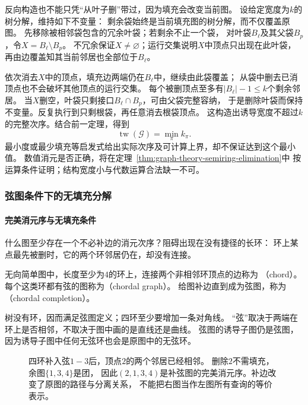 反向构造也不能只凭“从叶子删”带过，因为填充会改变当前图。
设给定宽度为\(k\)的树分解，维持如下不变量：
剩余袋始终是当前填充图的树分解，而不仅覆盖原图。
先移除被相邻袋包含的冗余叶袋；若剩余不止一个袋，
对叶袋\(B_\ell\)及其父袋\(B_p\)，令\(X=B_\ell\setminus B_p\)。
不冗余保证\(X\neq\varnothing\)；运行交集说明\(X\)中顶点只出现在此叶袋，
再由边覆盖知其当前邻居也全部位于\(B_\ell\)。

依次消去\(X\)中的顶点，填充边两端仍在\(B_\ell\)中，继续由此袋覆盖；
从袋中删去已消顶点也不会破坏其他顶点的运行交集。
每个被删顶点至多有\(|B_\ell|-1\leq k\)个剩余邻居。
当\(X\)删空，叶袋只剩接口\(B_\ell\cap B_p\)，可由父袋完整容纳，
于是删除叶袋而保持不变量。反复执行到只剩根袋，再任意消去根袋顶点。
这构造出诱导宽度不超过\(k\)的完整次序。结合前一定理，得到
\[
  \operatorname{tw}(\mathcal G)=\min_\pi k_\pi.
\]
最小度或最少填充等启发式给出实际次序及可计算上界，却不保证达到这个最小值。
数值消元是否正确，将在定理~\ref{thm:graph-theory-semiring-elimination}中
按运算条件证明；结构宽度小与代数运算合法缺一不可。

\subsubsection{弦图条件下的无填充分解}
\label{sec:graph-theory-chordal-elimination}

\paragraph{完美消元序与无填充条件}

什么图至少存在一个不必补边的消元次序？阻碍出现在没有捷径的长环：
环上某点最先被删时，它的两个环邻居仍在，却没有连接。

\begin{definition}[弦与弦图]
  \label{def:graph-theory-chordal-graph}
  无向简单图中，长度至少为\(4\)的环上，连接两个非相邻环顶点的边称为
  （chord）。每个这类环都有弦的图称为（chordal graph）。
  给图补边直到成为弦图，称为（chordal completion）。
\end{definition}

树没有环，因而满足弦图定义；四环至少要增加一条对角线。
“弦”取决于两端在环上是否相邻，不取决于图中画的是直线还是曲线。
弦图的诱导子图仍是弦图，因为诱导子图中任何无弦环也会是原图中的无弦环。

\begin{figure}[htbp]
  \centering
  
  \caption{四环补入弦\(1-3\)后，顶点\(2\)的两个邻居已经相邻。
  删除\(2\)不需填充，余图\(\{1,3,4\}\)是团，
  因此\((2,1,3,4)\)是补弦图的完美消元序。补边改变了原图的路径与分离关系，
  不能把右图当作左图所有查询的等价表示。}
  \label{fig:graph-theory-chordal-cycle}
\end{figure}

